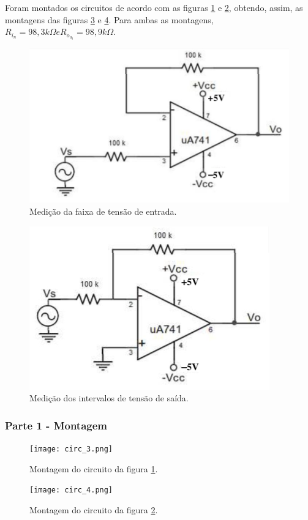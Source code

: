 \documentclass{abntex2}
\begin{document}
Foram montados os circuitos de acordo com as figuras \ref{fig:circuito4} e \ref{fig:circuito5}, obtendo, assim, as montagens das figuras \ref{fig:montagem5} e \ref{fig:montagem6}.
Para ambas as montagens, $R_i_n = 98,3k\Omega e R_o_u_t = 98,9k\Omega$.
\begin{figure}[h]
  \centering
  \includegraphics[scale = 0.5]{exp4-1.png}
  \caption{Medição da faixa de tensão de entrada.}
  \label{fig:circuito4}
\end{figure}
\begin{figure}[h]
  \centering
  \includegraphics[scale = 0.5]{exp4-2.png}
  \caption{Medição dos intervalos de tensão de saída.}
  \label{fig:circuito5}
\end{figure}

\subsubsection{Parte 1 - Montagem}

\begin{figure}[h]
  \centering
  \texttt{[image: circ\_3.png]}
  \caption{Montagem do circuito da figura \ref{fig:circuito4}.}
  \label{fig:montagem5}
\end{figure}
\begin{figure}[h]
  \centering
  \texttt{[image: circ\_4.png]}
  \caption{Montagem do circuito da figura \ref{fig:circuito5}.}
  \label{fig:montagem6}
\end{figure}
\end{document}

